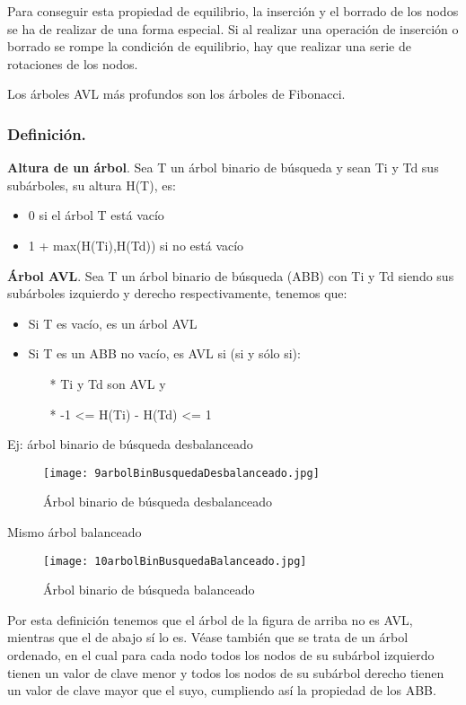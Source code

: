 Para conseguir esta propiedad de equilibrio, la inserción y el borrado
de los nodos se ha de realizar de una forma especial. Si al realizar
una operación de inserción o borrado se rompe la condición de
equilibrio, hay que realizar una serie de rotaciones de los nodos.

Los árboles AVL más profundos son los árboles de Fibonacci.

\subsubsection{Definición.}
\label{sec:definicion}
\begin{definicion}
  \textbf{Altura de un árbol}.  Sea T un árbol binario de búsqueda y sean Ti y
  Td sus subárboles, su altura H(T), es:
  \begin{itemize}
  \item 0 si el árbol T está vacío
  \item 1 + max(H(Ti),H(Td)) si no está vacío
  \end{itemize}
\end{definicion}

\begin{definicion}
  \textbf{Árbol AVL}.  Sea T un árbol binario de búsqueda (ABB) con Ti
  y Td siendo sus subárboles izquierdo y derecho respectivamente,
  tenemos que:
  \begin{itemize}
  \item Si T es vacío, es un árbol AVL
  \item Si T es un ABB no vacío, es AVL si (si y sólo si):
    \begin{itemize}
    \item[*] Ti y Td son AVL y
    \item[*] -1 <= H(Ti) - H(Td) <= 1
    \end{itemize}
  \end{itemize}
\end{definicion}

Ej: árbol binario de búsqueda desbalanceado
\begin{figure}[H]
  \centering
  \texttt{[image: 9arbolBinBusquedaDesbalanceado.jpg]}
  \caption{Árbol binario de búsqueda desbalanceado}
  \label{fig:9arbolBinBusquedaDesbalanceado.jpg}
\end{figure}

Mismo árbol balanceado
\begin{figure}[H]
  \centering
  \texttt{[image: 10arbolBinBusquedaBalanceado.jpg]}
  \caption{Árbol binario de búsqueda balanceado}
  \label{fig:10arbolBinBusquedaBalanceado}
\end{figure}
Por esta definición tenemos que el árbol de la figura de arriba no es
AVL, mientras que el de abajo sí lo es. Véase también que se trata de
un árbol ordenado, en el cual para cada nodo todos los nodos de su
subárbol izquierdo tienen un valor de clave menor y todos los nodos de
su subárbol derecho tienen un valor de clave mayor que el suyo,
cumpliendo así la propiedad de los ABB.

